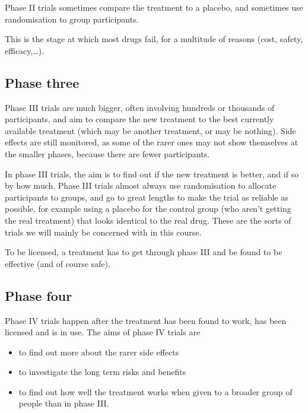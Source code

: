 \documentclass[
  openany]{book}
\providecommand{\tightlist}{%
  \setlength{\itemsep}{0pt}\setlength{\parskip}{0pt}}
\theoremstyle{definition}
\theoremstyle{definition}
\theoremstyle{definition}
\theoremstyle{definition}
\theoremstyle{remark}
\begin{document}
Phase II trials sometimes compare the treatment to a placebo, and sometimes use randomisation to group participants.

This is the stage at which most drugs fail, for a multitude of reasons (cost, safety, efficacy,\ldots).

\subsection*{Phase three}\label{phase-three}

Phase III trials are much bigger, often involving hundreds or thousands of participants, and aim to compare the new treatment to the best currently available treatment (which may be another treatment, or may be nothing). Side effects are still monitored, as some of the rarer ones may not show themselves at the smaller phases, because there are fewer participants.

In phase III trials, the aim is to find out if the new treatment is better, and if so by how much. Phase III trials almost always use randomisation to allocate participants to groups, and go to great lengths to make the trial as reliable as possible, for example using a placebo for the control group (who aren't getting the real treatment) that looks identical to the real drug. These are the sorts of trials we will mainly be concerned with in this course.

To be licensed, a treatment has to get through phase III and be found to be effective (and of course safe).

\subsection*{Phase four}\label{phase-four}

Phase IV trials happen after the treatment has been found to work, has been licensed and is in use. The aims of phase IV trials are

\begin{itemize}
\tightlist
\item
  to find out more about the rarer side effects
\item
  to investigate the long term risks and benefits
\item
  to find out how well the treatment works when given to a broader group of people than in phase III.
\end{itemize}
\end{document}

